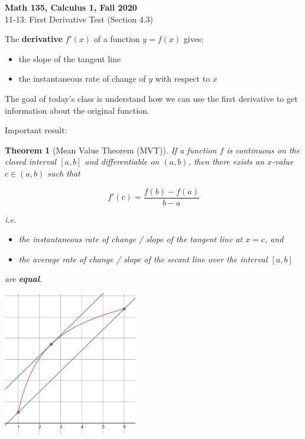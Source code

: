 \documentclass[11pt,reqno,final]{amsart}
\numberwithin{figure}{section}
\newtheorem{theorem}[equation]{Theorem}%
\theoremstyle{definition} %
\begin{document}
\begin{center}
        \textbf{\Large Math 135, Calculus 1, Fall 2020}\\[10pt]
        {\large 11-13: First Derivative Test (Section 4.3)}
\end{center}

\thispagestyle{empty}


\renewcommand{\thesection}{\Alph{section}}


The \textbf{derivative} $f'(x)$ of a function $y=f(x)$ gives:
\begin{itemize}
\item the slope of the tangent line
\item the instantaneous rate of change of $y$ with respect to $x$
\end{itemize}

The goal of today's class is understand how we can use the first derivative to get information about the original function.

Important result:
\begin{theorem}[Mean Value Theorem (MVT)]
        If a function $f$ is continuous on the closed interval $[a,b]$ and differentiable on $(a,b)$,
        then there exists an $x$-value $c \in (a,b)$ such that\\
        \begin{minipage}{0.5\textwidth}
                \[
                        f'(c) = \dfrac{f(b) - f(a)}{b-a}
                \]
                
                i.e.
                \begin{itemize}
                \item the \textit{instantaneous rate of change / slope of the tangent line} at $x = c$, and
                \item the \textit{average rate of change / slope of the secant line} over the interval $[a,b]$
                \end{itemize}
                are \textbf{equal}.        
        \end{minipage}
        \begin{minipage}{0.5\textwidth}
                \begin{center}
                        \includegraphics[width=2.3in]{11-13P_mvt.png}
                \end{center}
        \end{minipage}
\end{theorem}
\end{document}
